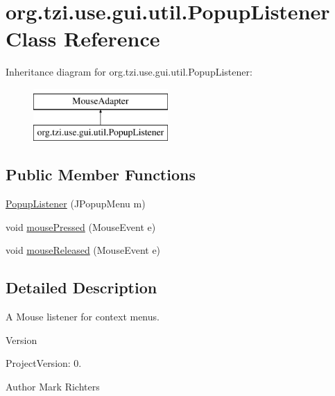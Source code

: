\hypertarget{classorg_1_1tzi_1_1use_1_1gui_1_1util_1_1_popup_listener}{\section{org.\-tzi.\-use.\-gui.\-util.\-Popup\-Listener Class Reference}
\label{classorg_1_1tzi_1_1use_1_1gui_1_1util_1_1_popup_listener}
}
Inheritance diagram for org.\-tzi.\-use.\-gui.\-util.\-Popup\-Listener\-:\begin{figure}[H]
\begin{center}
\leavevmode
\includegraphics[height=2.000000cm]{classorg_1_1tzi_1_1use_1_1gui_1_1util_1_1_popup_listener}
\end{center}
\end{figure}
\subsection*{Public Member Functions}
\begin{DoxyCompactItemize}
\item 
\hyperlink{classorg_1_1tzi_1_1use_1_1gui_1_1util_1_1_popup_listener_a46b238719803f36e0c8eba442b787eef}{Popup\-Listener} (J\-Popup\-Menu m)
\item 
void \hyperlink{classorg_1_1tzi_1_1use_1_1gui_1_1util_1_1_popup_listener_afb6c4ac2f4f4681eaf25d3bc48fb6d5f}{mouse\-Pressed} (Mouse\-Event e)
\item 
void \hyperlink{classorg_1_1tzi_1_1use_1_1gui_1_1util_1_1_popup_listener_a6a283af2a9090f19e095842e909c7fe8}{mouse\-Released} (Mouse\-Event e)
\end{DoxyCompactItemize}


\subsection{Detailed Description}
A Mouse listener for context menus.

\begin{DoxyVersion}{Version}

\end{DoxyVersion}
\begin{DoxyParagraph}{Project\-Version\-:}
0. 
\end{DoxyParagraph}
\begin{DoxyAuthor}{Author}
Mark Richters 
\end{DoxyAuthor}


